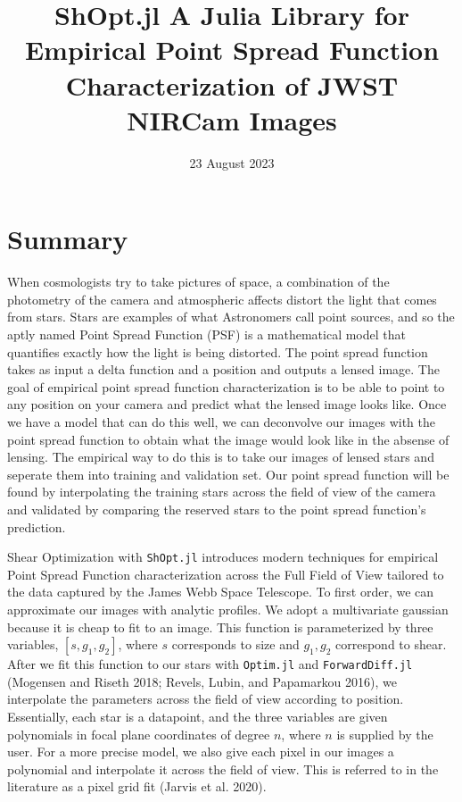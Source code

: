 \documentclass[
]{article}
\title{ShOpt.jl \textbar{} A Julia Library for Empirical Point Spread
Function Characterization of JWST NIRCam Images}
\author{}
\date{23 August 2023}
\begin{document}
\maketitle

\hypertarget{summary}{%
\section{Summary}\label{summary}}

When cosmologists try to take pictures of space, a combination of the
photometry of the camera and atmospheric affects distort the light that
comes from stars. Stars are examples of what Astronomers call point
sources, and so the aptly named Point Spread Function (PSF) is a
mathematical model that quantifies exactly how the light is being
distorted. The point spread function takes as input a delta function and
a position and outputs a lensed image. The goal of empirical point
spread function characterization is to be able to point to any position
on your camera and predict what the lensed image looks like. Once we
have a model that can do this well, we can deconvolve our images with
the point spread function to obtain what the image would look like in
the absense of lensing. The empirical way to do this is to take our
images of lensed stars and seperate them into training and validation
set. Our point spread function will be found by interpolating the
training stars across the field of view of the camera and validated by
comparing the reserved stars to the point spread function's prediction.

Shear Optimization with \texttt{ShOpt.jl} introduces modern techniques
for empirical Point Spread Function characterization across the Full
Field of View tailored to the data captured by the James Webb Space
Telescope. To first order, we can approximate our images with analytic
profiles. We adopt a multivariate gaussian because it is cheap to fit to
an image. This function is parameterized by three variables,
\([s, g_1, g_2]\), where \(s\) corresponds to size and \(g_1 , g_2\)
correspond to shear. After we fit this function to our stars with
\texttt{Optim.jl} and \texttt{ForwardDiff.jl} (Mogensen and Riseth 2018;
Revels, Lubin, and Papamarkou 2016), we interpolate the parameters
across the field of view according to position. Essentially, each star
is a datapoint, and the three variables are given polynomials in focal
plane coordinates of degree \(n\), where \(n\) is supplied by the user.
For a more precise model, we also give each pixel in our images a
polynomial and interpolate it across the field of view. This is referred
to in the literature as a pixel grid fit (Jarvis et al. 2020).
\end{document}
